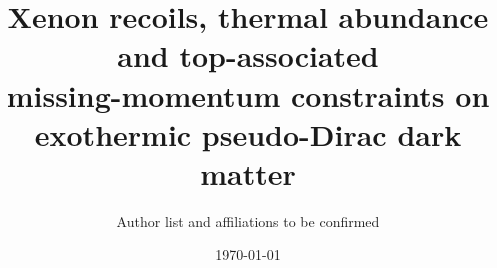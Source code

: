 \documentclass[11pt]{article}
\title{\bfseries Xenon recoils, thermal abundance and top-associated\\ missing-momentum constraints on exothermic pseudo-Dirac dark matter}
\author{Author list and affiliations to be confirmed}
\date{\today}
\begin{document}
\maketitle

\begin{abstract}

\end{abstract}











\FloatBarrier

\end{document}

